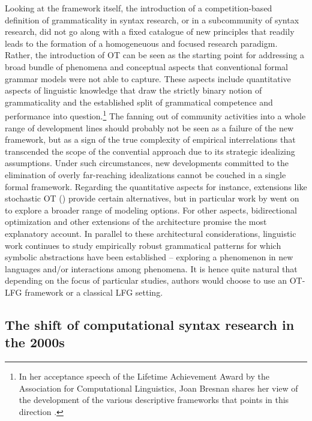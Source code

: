 \documentclass[output=paper,hidelinks]{langscibook}
\begin{document}
Looking at the framework itself, the introduction of a competition-based definition of grammaticality in syntax research, or in a subcommunity of syntax research, did not go along with a fixed catalogue of new principles that readily leads to the formation of a homogeneuous and focused research paradigm. Rather, the introduction of OT can be seen as the starting point for addressing a broad bundle of phenomena and conceptual aspects that conventional formal grammar models were not able to capture.  These aspects include quantitative aspects of linguistic knowledge that draw the strictly binary notion of grammaticality and the established split of grammatical competence and performance into question.\footnote{In her acceptance speech of the Lifetime Achievement Award by the Association for Computational Linguistics, Joan Bresnan shares her view of the development of the various descriptive frameworks that points in this direction \citep{bresnan-2016-lifetime,}.} %
The fanning out of community activities into a whole range of development lines should probably not be seen as a failure of the new framework, but as a sign of the true complexity of empirical interrelations that transcended the scope of the convential approach due to its strategic idealizing assumptions. Under such circumstances, new developments committed to the elimination of overly far-reaching idealizations cannot be couched in a single formal framework.
Regarding the quantitative aspects for instance, extensions like stochastic OT () provide certain alternatives, but in particular work by \citet{Bresnan2007,BresnanFord2010,Bresnan10gradience} went on to explore a broader range of modeling options. For other aspects, bidirectional optimization and other extensions of the architecture promise the most explanatory account.
In parallel to these architectural considerations, linguistic work continues to study empirically robust grammatical patterns for which symbolic abstractions have been established -- exploring a phenomenon in new languages and/or interactions among phenomena. It is hence quite natural that depending on the focus of particular studies, authors would choose to use an OT-LFG framework or a classical LFG setting. 

\subsection{The shift of computational syntax research in the 2000s} 
\label{sec:OT:shift-computational}
\end{document}
